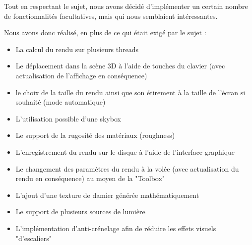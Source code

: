 Tout en respectant le sujet, nous avons décidé d'implémenter un certain nombre de fonctionnalités facultatives, mais qui nous semblaient intéressantes.

Nous avons donc réalisé, en plus de ce qui était exigé par le sujet :
\begin{itemize}
    \item La calcul du rendu sur plusieurs threads
    \item Le déplacement dans la scène 3D à l'aide de touches du clavier (avec actualisation de l'affichage en conséquence)
    \item le choix de la taille du rendu ainsi que son étirement à la taille de l'écran si souhaité (mode automatique)
    \item L'utilisation possible d'une skybox
    \item Le support de la rugosité des matériaux (roughness)
    \item L'enregistrement du rendu sur le disque à l'aide de l'interface graphique
    \item Le changement des paramètres du rendu à la volée (avec actualisation du rendu en conséquence) au moyen de la "Toolbox"
    \item L'ajout d'une texture de damier générée mathématiquement
	\item Le support de plusieurs sources de lumière
	\item L'implémentation d'anti-crénelage afin de réduire les effets visuels "d'escaliers"
\end{itemize}
